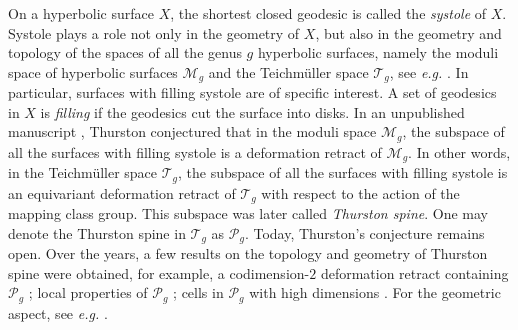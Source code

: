 \documentclass[UTF8]{amsart}
\numberwithin{equation}{section}
\theoremstyle{definition}
\theoremstyle{example}
\theoremstyle{remark}
\begin{document}
On a hyperbolic surface $X$, the shortest closed geodesic is called the \emph{systole} of $X$. 
Systole plays a role not only in the geometry of $X$, but also in the geometry and topology of the spaces of all the genus $g$ hyperbolic surfaces, namely the moduli space of hyperbolic surfaces $\mathcal{M}_g$ and the Teichm\"uller space $\mathcal{T}_g$, see \emph{e.g.} \cite{mumford1971remark, schaller1999systoles, akrout2003singularites, bourque2021local, wu2024systole}. 
In particular, surfaces with filling systole are of specific interest. A set of geodesics in $X$ is \emph{filling} if the geodesics cut the surface into disks. In an unpublished manuscript \cite{thurston1986spine}, Thurston conjectured that in the moduli space $\mathcal{M}_g$, the subspace of all the surfaces with filling systole is a deformation retract of $\mathcal{M}_g$. In other words, in the Teichm\"uller space $\mathcal{T}_g$, the subspace of all the surfaces with filling systole is an equivariant deformation retract of $\mathcal{T}_g$ with respect to the action of the mapping class group. This subspace was later called \emph{Thurston spine}. One may denote the Thurston spine in $\mathcal{T}_g$ as $\mathcal{P}_g$. 
Today, Thurston's conjecture remains open. Over the years, a few results on the topology and geometry of Thurston spine were obtained, for example, a codimension-$2$ deformation retract containing $\mathcal{P}_g$ \cite{ji2014well}; local properties of $\mathcal{P}_g$ \cite{irmer2025morse}; cells in $\mathcal{P}_g$ with high dimensions \cite{bourque2020hyperbolic, fortier2024dimension, irmer2023small, mathieu2023estimating}. For the geometric aspect, see \emph{e.g.} \cite{anderson2016relative, gao2024shape}. 
\end{document}
